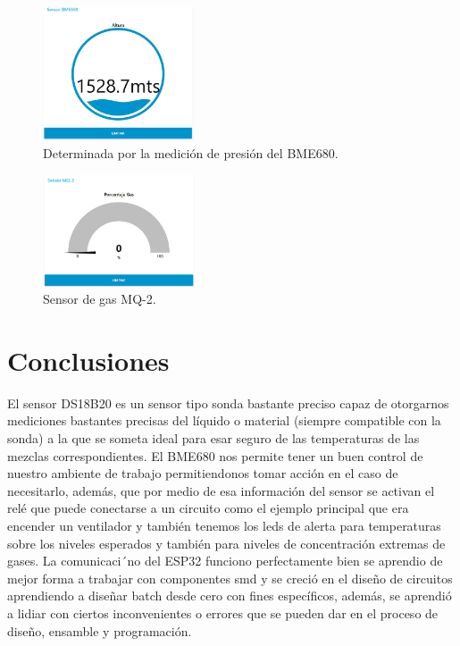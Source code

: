 \documentclass[10pt,twocolumn,letterpaper]{article}
\begin{document}
\begin{Abstract}
\begin{figure}
  \centering
  \includegraphics[width=0.4\textwidth]{Altura.jpg}
  \caption{Determinada por la medición de presión del BME680.}
\end{figure}

\begin{figure}
  \centering
  \includegraphics[width=0.4\textwidth]{GAS.jpg}
  \caption{Sensor de gas MQ-2.}
\end{figure}

\section*{Conclusiones}
El sensor DS18B20 es un sensor tipo sonda bastante preciso capaz de otorgarnos mediciones bastantes precisas del líquido o material (siempre compatible con la sonda) a la que se someta ideal para esar seguro de las temperaturas de las mezclas correspondientes. El BME680 nos permite tener un buen control de nuestro ambiente de trabajo permitiendonos tomar acción en el caso de necesitarlo, además, que por medio de esa información del sensor se activan el relé que puede conectarse a un circuito como el ejemplo principal que era encender un ventilador y también tenemos los leds de alerta para temperaturas sobre los niveles esperados y también para niveles de concentración extremas de gases. La comunicaci´no del ESP32 funciono perfectamente bien se aprendio de mejor forma a trabajar con componentes smd y se creció en el diseño de circuitos aprendiendo a diseñar batch desde cero con fines específicos, además, se aprendió a lidiar con ciertos inconvenientes o errores que se pueden dar en el proceso de diseño, ensamble y programación.


\end{Abstract}
\end{document}
